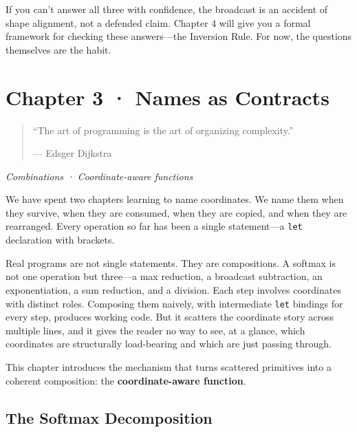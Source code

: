 \documentclass[11pt,titlepage]{article}
\begin{document}
If you can't answer all three with confidence, the broadcast is an
accident of shape alignment, not a defended claim. Chapter 4 will give
you a formal framework for checking these answers---the Inversion Rule.
For now, the questions themselves are the habit.

\newpage

\hypertarget{chapter-3-names-as-contracts}{%
\section{Chapter 3 · Names as
Contracts}\label{chapter-3-names-as-contracts}}

\begin{quote}
``The art of programming is the art of organizing complexity.''

--- Edsger Dijkstra
\end{quote}

\emph{Combinations · Coordinate-aware functions}

\vspace{2em}

We have spent two chapters learning to name coordinates. We name them
when they survive, when they are consumed, when they are copied, and
when they are rearranged. Every operation so far has been a single
statement---a \texttt{let} declaration with brackets.

Real programs are not single statements. They are compositions. A
softmax is not one operation but three---a max reduction, a broadcast
subtraction, an exponentiation, a sum reduction, and a division. Each
step involves coordinates with distinct roles. Composing them naively,
with intermediate \texttt{let} bindings for every step, produces working
code. But it scatters the coordinate story across multiple lines, and it
gives the reader no way to see, at a glance, which coordinates are
structurally load-bearing and which are just passing through.

This chapter introduces the mechanism that turns scattered primitives
into a coherent composition: the \textbf{coordinate-aware function}.

\vspace{2em}

\hypertarget{the-softmax-decomposition}{%
\subsection{The Softmax Decomposition}\label{the-softmax-decomposition}}
\end{document}
